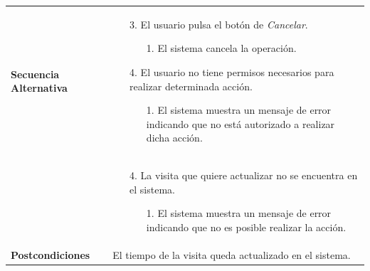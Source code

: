\begin{longtable}{| p{4cm} | p{10cm} |}
\\
\hline
\textbf{Secuencia Alternativa} &\mbox{}\par\vspace{-\baselineskip}
\begin{enumerate}[leftmargin=0.7cm, topsep=0.1cm]
\item[3.] El usuario pulsa el botón de \textit{Cancelar}.
	\begin{itemize}
	\item[1.] El sistema cancela la operación.
	\end{itemize}
\item[4.] El usuario no tiene permisos necesarios para realizar determinada acción.
	\begin{itemize}
	\item[1.] El sistema muestra un mensaje de error indicando que no está autorizado a realizar dicha acción.
	\end{itemize}
\end{enumerate}
\\ &\mbox{}\par\vspace{-\baselineskip}	
\begin{enumerate}[leftmargin=0.7cm, topsep=0.1cm]
\item[4.] La visita que quiere actualizar no se encuentra en el sistema.
	\begin{itemize}
	\item[1.] El sistema muestra un mensaje de error indicando que no es posible realizar la acción.
	\end{itemize}
\end{enumerate}
\\

\hline
\textbf{Postcondiciones} & 
El tiempo de la visita queda actualizado en el sistema.\\
\hline
\end{longtable}



\newpage
